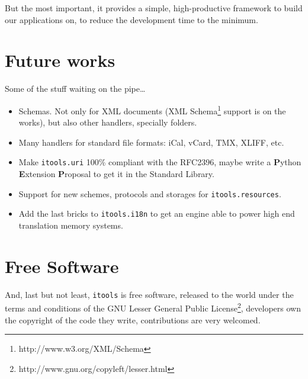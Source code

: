 But the most important, it provides a simple, high-productive framework
to build our applications on, to reduce the development time to the
minimum.

\section{Future works}

Some of the stuff waiting on the pipe\ldots

\begin{itemize}
  \item Schemas. Not only for XML documents (XML
    Schema\footnote{http://www.w3.org/XML/Schema} support is on the works),
    but also other handlers, specially folders.

  \item Many handlers for standard file formats: iCal, vCard, TMX, XLIFF, etc.

  \item Make {\tt itools.uri} 100\% compliant with the RFC2396,
    maybe write a {\bf P}ython {\bf E}xtension {\bf P}roposal to
    get it in the Standard Library.

  \item Support for new schemes, protocols and storages for
    {\tt itools.resources}.

  \item Add the last bricks to {\tt itools.i18n} to get an engine able
    to power high end translation memory systems.
\end{itemize}


\section{Free Software}

And, last but not least, {\tt itools} is free software, released to the
world under the terms and conditions of the GNU Lesser General Public
License\footnote{http://www.gnu.org/copyleft/lesser.html}, developers
own the copyright of the code they write, contributions are very welcomed.
